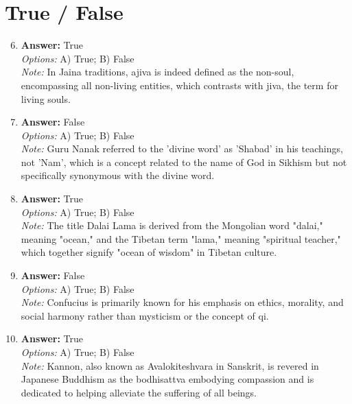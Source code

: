 \documentclass[12pt]{article}
\begin{document}
\section*{True / False}
\begin{enumerate}[label=\arabic*.]
\setcounter{enumi}{5}
\item \textbf{Answer:} True
\\ \textit{Options:} A) True; B) False
\\ \textit{Note:} In Jaina traditions, ajiva is indeed defined as the non-soul, encompassing all non-living entities, which contrasts with jiva, the term for living souls.
\item \textbf{Answer:} False
\\ \textit{Options:} A) True; B) False
\\ \textit{Note:} Guru Nanak referred to the 'divine word' as 'Shabad' in his teachings, not 'Nam', which is a concept related to the name of God in Sikhism but not specifically synonymous with the divine word.
\item \textbf{Answer:} True
\\ \textit{Options:} A) True; B) False
\\ \textit{Note:} The title Dalai Lama is derived from the Mongolian word "dalai," meaning "ocean," and the Tibetan term "lama," meaning "spiritual teacher," which together signify "ocean of wisdom" in Tibetan culture.
\item \textbf{Answer:} False
\\ \textit{Options:} A) True; B) False
\\ \textit{Note:} Confucius is primarily known for his emphasis on ethics, morality, and social harmony rather than mysticism or the concept of qi.
\item \textbf{Answer:} True
\\ \textit{Options:} A) True; B) False
\\ \textit{Note:} Kannon, also known as Avalokiteshvara in Sanskrit, is revered in Japanese Buddhism as the bodhisattva embodying compassion and is dedicated to helping alleviate the suffering of all beings.
\end{enumerate}
\end{document}
